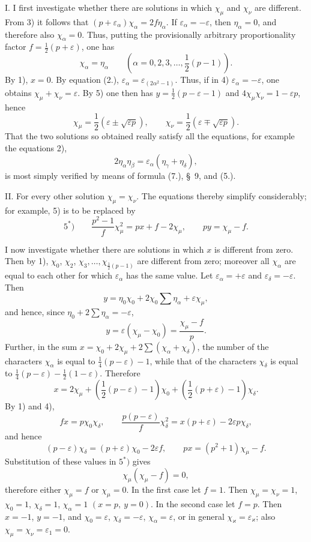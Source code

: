 \documentclass[11pt]{article}
\begin{document}
I. I first investigate whether there are solutions in which $\chi_\mu$ and $\chi_\nu$ are different. From 3) it follows that $(p+\varepsilon_\alpha)\chi_\alpha=2f\eta_\alpha$. If $\varepsilon_\alpha=-\varepsilon$, then $\eta_\alpha=0$, and therefore also $\chi_\alpha=0$. Thus, putting the provisionally arbitrary proportionality factor $f=\frac12(p+\varepsilon)$, one has
\[
\chi_\alpha=\eta_\alpha\qquad\left(\alpha=0,2,3,\ldots,\frac12(p-1)\right).
\]
By 1), $x=0$. By equation (2.), $\varepsilon_\alpha=\varepsilon_{(2\alpha^2-1)}$. Thus, if in 4) $\varepsilon_\alpha=-\varepsilon$, one obtains $\chi_\mu+\chi_\nu=\varepsilon$. By 5) one then has $y=\frac12(p-\varepsilon-1)$ and $4\chi_\mu\chi_\nu=1-\varepsilon p$, hence
\[
\chi_\mu=\frac12(\varepsilon\pm\sqrt{\varepsilon p}),\qquad
\chi_\nu=\frac12(\varepsilon\mp\sqrt{\varepsilon p}).
\]
That the two solutions so obtained really satisfy all the equations, for example the equations 2),
\begin{equation*}\tag{8.}
2\eta_\alpha\eta_\beta=\varepsilon_\alpha(\eta_\gamma+\eta_\delta),
\end{equation*}
is most simply verified by means of formula (7.), \S~9, and (5.).

II. For every other solution $\chi_\mu=\chi_\nu$. The equations thereby simplify considerably; for example, 5) is to be replaced by
\[
5^*)\qquad
\frac{p^2-1}{f}\chi_\mu^2=px+f-2\chi_\mu,\qquad
py=\chi_\mu-f.
\]

I now investigate whether there are solutions in which $x$ is different from zero. Then by 1), $\chi_0$, $\chi_2$, $\chi_3,\ldots,\chi_{\frac12(p-1)}$ are different from zero; moreover all $\chi_\alpha$ are equal to each other for which $\varepsilon_\alpha$ has the same value. Let $\varepsilon_\alpha=+\varepsilon$ and $\varepsilon_\delta=-\varepsilon$. Then
\[
y=\eta_0\chi_0+2\chi_0\sum\eta_\alpha+\varepsilon\chi_\mu,
\]
and hence, since $\eta_0+2\sum\eta_\alpha=-\varepsilon$,
\[
y=\varepsilon(\chi_\mu-\chi_0)=\frac{\chi_\mu-f}{p}.
\]
Further, in the sum $x=\chi_0+2\chi_\mu+2\sum(\chi_\alpha+\chi_\delta)$, the number of the characters $\chi_\alpha$ is equal to $\frac14(p-\varepsilon)-1$, while that of the characters $\chi_\delta$ is equal to $\frac14(p-\varepsilon)-\frac12(1-\varepsilon)$. Therefore
\[
x=2\chi_\mu+\left(\frac12(p-\varepsilon)-1\right)\chi_0+
\left(\frac12(p+\varepsilon)-1\right)\chi_\delta.
\]
By 1) and 4),
\[
fx=p\chi_0\chi_\delta,\qquad
\frac{p(p-\varepsilon)}{f}\chi_\delta^2=x(p+\varepsilon)-2\varepsilon p\chi_\delta,
\]
and hence
\[
(p-\varepsilon)\chi_\delta=(p+\varepsilon)\chi_0-2\varepsilon f,\qquad
px=(p^2+1)\chi_\mu-f.
\]
Substitution of these values in $5^*)$ gives
\[
\chi_\mu(\chi_\mu-f)=0,
\]
therefore either $\chi_\mu=f$ or $\chi_\mu=0$. In the first case let $f=1$. Then $\chi_\mu=\chi_\nu=1$, $\chi_0=1$, $\chi_\delta=1$, $\chi_\alpha=1$ $(x=p,\ y=0)$. In the second case let $f=p$. Then $x=-1$, $y=-1$, and $\chi_0=\varepsilon$, $\chi_\delta=-\varepsilon$, $\chi_\alpha=\varepsilon$, or in general $\chi_\varkappa=\varepsilon_\varkappa$; also $\chi_\mu=\chi_\nu=\varepsilon_1=0$.
\end{document}
